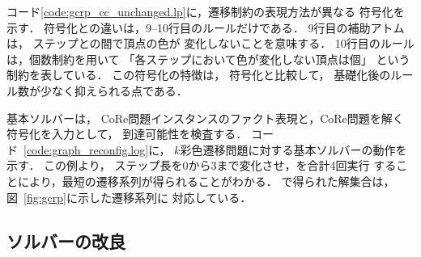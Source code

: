 コード\ref{code:gcrp_cc_unchanged.lp}に，遷移制約の表現方法が異なる
符号化を示す．
符号化との違いは，9--10行目のルールだけである．
9行目の補助アトムは，
ステップとの間で頂点の色が
変化しないことを意味する．
10行目のルールは，個数制約を用いて
「各ステップにおいて色が変化しない頂点は個」
という制約を表している．
この符号化の特徴は，
符号化と比較して，
基礎化後のルール数が少なく抑えられる点である．

基本ソルバーは，
CoRe問題インスタンスのファクト表現と，CoRe問題を解く符号化を入力として，
到達可能性を検査する．
コード~\ref{code:graph_reconfig.log}に，
$k$彩色遷移問題に対する基本ソルバーの動作を示す．
この例より，
ステップ長を0から3まで変化させ，{\clingo}を合計4回実行
することにより，最短の遷移系列が得られることがわかる．
で得られた解集合は，図~\ref{fig:gcrp}に示した遷移系列に
対応している．







\subsection{ソルバーの改良} \label{sec:improved_solver}

